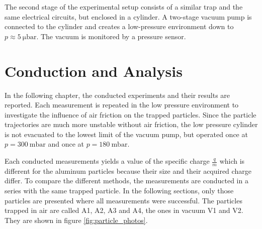 \documentclass[
	paper=A4,
	parskip=full,
	chapterprefix=true,
	11pt,
	headings=normal,
	bibliography=totoc,
	listof=totoc,
	titlepage=on,
]{scrreprt}
\begin{document}
The second stage of the experimental setup consists of a similar trap and the same electrical circuits, but enclosed in a cylinder. A two-stage vacuum pump is connected to the cylinder and creates a low-pressure environment down to $p \approx \SI{5}{\micro \bar}$. The vacuum is monitored by a pressure sensor.

\chapter{Conduction and Analysis}
\label{ch:analysis}
In the following chapter, the conducted experiments and their results are reported. Each measurement is repeated in the low pressure environment to investigate the influence of air friction on the trapped particles. Since the particle trajectories are much more unstable without air friction, the low pressure cylinder is not evacuated to the lowest limit of the vacuum pump, but operated once at $p = \SI{300}{\milli \bar}$ and once at $p = \SI{180}{\milli \bar}$. 

Each conducted measurements yields a value of the specific charge $\frac{q}{m}$ which is different for the aluminum particles because their size and their acquired charge differ. To compare the different methods, the measurements are conducted in a series with the same trapped particle. In the following sections, only those particles are presented where all measurements were successful. The particles trapped in air are called A1, A2, A3 and A4, the ones in vacuum V1 and V2. They are shown in figure \ref{fig:particle_photos}.
\end{document}
